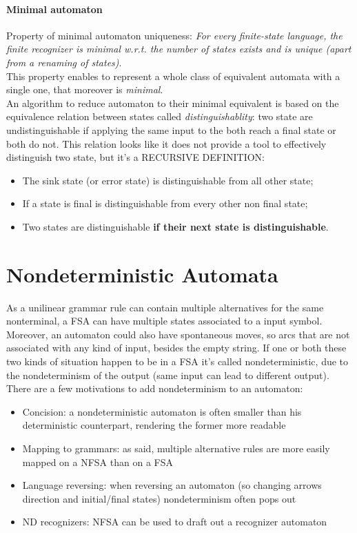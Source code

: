 \documentclass[10pt,a4paper]{article}
\begin{document}
		\paragraph{Minimal automaton}
			Property of minimal automaton uniqueness: \emph{For every finite-state language, the finite recognizer is minimal w.r.t. the number of states exists and is unique (apart from a renaming of states)}.\\
			This property enables to represent a whole class of equivalent automata with a single one, that moreover is \emph{minimal}.\\
			An algorithm to reduce automaton to their minimal equivalent is based on the equivalence relation between states called \emph{distinguishablity}: two state are undistinguishable if applying the same input to the both reach a final state or both do not. This relation looks like it does not provide a tool to effectively distinguish two state, but it's a RECURSIVE DEFINITION:
			\begin{itemize}
				\item The sink state (or error state) is distinguishable from all other state;
				\item If a state is final is distinguishable from every other non final state;
				\item Two states are distinguishable \textbf{if their next state is distinguishable}.
			\end{itemize}
		
		\section{Nondeterministic Automata}
			As a unilinear grammar rule can contain multiple alternatives for the same nonterminal, a FSA can have multiple states associated to a input symbol. Moreover, an automaton could also have spontaneous moves, so arcs that are not associated with any kind of input, besides the empty string. If one or both these two kinds of situation happen to be in a FSA it's called nondeterministic, due to the nondeterminism of the output (same input can lead to different output).\\
			There are a few motivations to add nondeterminism to an automaton:
			\begin{itemize}
				\item Concision: a nondeterministic automaton is often smaller than his deterministic counterpart, rendering the former more readable
				\item Mapping to grammars: as said, multiple alternative rules are more easily mapped on a NFSA than on a FSA
				\item Language reversing: when reversing an automaton (so changing arrows direction and initial/final states) nondeterminism often pops out
				\item ND recognizers: NFSA can be used to draft out a recognizer automaton
			\end{itemize}
\end{document}
